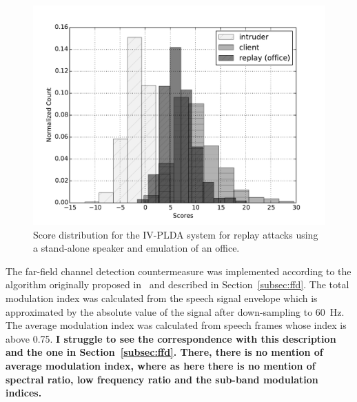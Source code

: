 \begin{figure}
	\centering
	\begin{minipage}{.5\textwidth}
	\includegraphics[width=1\linewidth]{Figs/dist_IV_off.pdf}
	\end{minipage}

%

	\caption{Score distribution for the IV-PLDA system for replay attacks using a stand-alone speaker and emulation of an office.}
	\label{fig::Dist_IV}
\end{figure}


The far-field channel detection countermeasure was implemented according to the algorithm originally proposed in~\cite{Villalba2011} and described in Section~\ref{subsec:ffd}. The total modulation index was calculated from the speech signal envelope which is approximated by the absolute value of the signal after down-sampling to 60~Hz.  The average modulation index was calculated from speech frames whose index is above 0.75.  {\bfseries I struggle to see the correspondence with this description and the one in Section~\ref{subsec:ffd}.  There, there is no mention of average modulation index, where as here there is no mention of spectral ratio, low frequency ratio and the sub-band modulation indices.}




